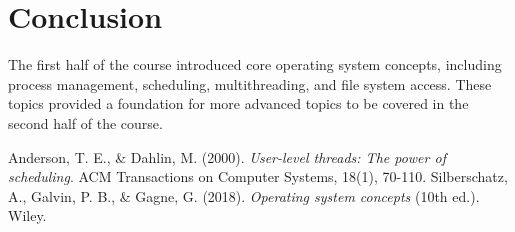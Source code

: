 \documentclass[12pt]{article}
\begin{document}
\section{Conclusion}
The first half of the course introduced core operating system concepts, including process management, scheduling, multithreading, and file system access. These topics provided a foundation for more advanced topics to be covered in the second half of the course.

\begin{thebibliography}{9}
     Anderson, T. E., & Dahlin, M. (2000). \textit{User-level threads: The power of scheduling}. ACM Transactions on Computer Systems, 18(1), 70-110.
     Silberschatz, A., Galvin, P. B., & Gagne, G. (2018). \textit{Operating system concepts} (10th ed.). Wiley.
\end{thebibliography}
\end{document}
